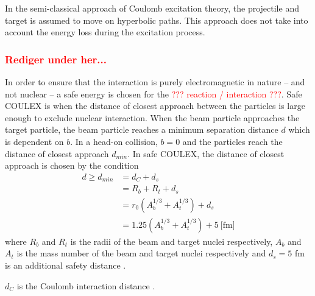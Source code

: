 \documentclass[twoside,english]{uiofysmaster/uiofysmaster}
\begin{document}
In the semi-classical approach of Coulomb excitation theory, the projectile and target is assumed to move on hyperbolic paths. 
This approach does not take into account the energy loss during the excitation process.





\bigskip

\subsubsection*{\textcolor{red}{Rediger under her...}}

In order to ensure that the interaction is purely electromagnetic in nature – and not nuclear – a safe energy is chosen for the \textcolor{red}{??? reaction / interaction ???}. 
Safe COULEX is when the distance of closest approach between the particles is large enough to exclude nuclear interaction.
When the beam particle approaches the target particle, the beam particle reaches a minimum separation distance $d$ which is dependent on $b$. 
In a head-on collision, $b = 0$ and the particles reach the distance of closest approach $d_{min}$. 
In safe COULEX, the distance of closest approach is chosen by the condition
\begin{align}
	d \geq d_{min} &= d_C + d_s \nonumber \\
	&= R_b + R_t + d_s \nonumber \\
	&= r_0 (A_b^{1/3} + A_t^{1/3}) + d_s \nonumber \\
	&= 1.25 (A_b^{1/3} + A_t^{1/3}) + 5~\text{[fm]}
\end{align}
where $R_b$ and $R_t$ is the radii of the beam and target nuclei respectively, 
$A_b$ and $A_t$ is the mass number of the beam and target nuclei respectively and $d_s = 5$ fm is an additional safety distance \cite{Cline1986}.

$d_C$ is the Coulomb interaction distance \cite{RBass}.
\end{document}
